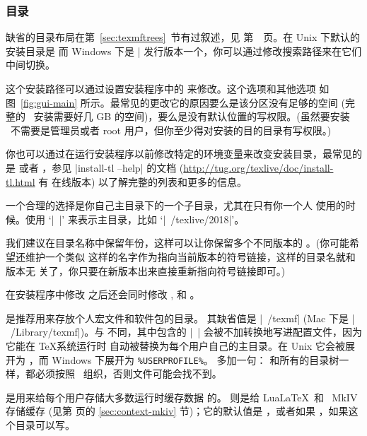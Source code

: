 \documentclass{article}
\begin{document}
\subsubsection{目录}
\label{sec:directories}

缺省的目录布局在第~\ref{sec:texmftrees}~节有过叙述，见
第~\pageref{sec:texmftrees}~页。在 Unix 下默认的安装目录是
 而 Windows 下是
|%
发行版本一个，你可以通过修改搜索路径来在它们中间切换。

这个安装路径可以通过设置安装程序中的  来修改。这个选项和其他选项
如图~\ref{fig:gui-main} 所示。最常见的更改它的原因要么是该分区没有足够的空间 (完
整的 \TL\ 安装需要好几 GB 的空间)，要么是没有默认位置的写权限。(虽然要安装
\TL\ 不需要是管理员或者 root 用户，但你至少得对安装的目的目录有写权限。)

你也可以通过在运行安装程序以前修改特定的环境变量来改变安装目录，最常见的是
 或者 ，参见
|install-tl --help| 的文档 (\url{http://tug.org/texlive/doc/install-tl.html} 有
在线版本) 以了解完整的列表和更多的信息。

一个合理的选择是你自己主目录下的一个子目录，尤其在只有你一个人
使用的时候。使用 `|~|' 来表示主目录，比如 `|~/texlive/2018|'。

我们建议在目录名称中保留年份，这样可以让你保留多个不同版本的
\TL{}。(你可能希望还维护一个类似 
这样的名字作为指向当前版本的符号链接，这样的目录名就和版本无
关了，你只要在新版本出来直接重新指向符号链接即可。)

在安装程序中修改  之后还会同时修改
,  和
。

 是推荐用来存放个人宏文件和软件包的目录。
其缺省值是 |~/texmf| (Mac 下是 |~/Library/texmf|)。与 
不同，其中包含的 |~| 会被不加转换地写进配置文件，因为它能在 \TeX 系统运行时
自动被替换为每个用户自己的主目录。在 Unix 它会被展开为
，而 Windows 下展开为 \verb|%USERPROFILE%|。
多加一句： 和所有的目录树一样，都必须按照
\TDS\ 组织，否则文件可能会找不到。

 是用来给每个用户存储大多数运行时缓存数据
的。 则是给 Lua\LaTeX\ 和 \ConTeXt\ MkIV 存储缓存
(见第 \pageref{sec:context-mkiv} 页的 \ref{sec:context-mkiv} 节)；它的默认值是
，或者如果 ，如果这个目录可以写。
\end{document}

